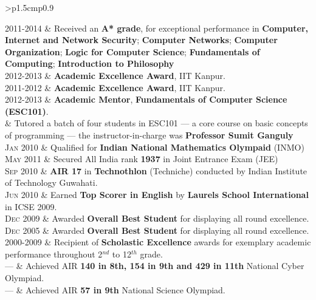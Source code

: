 \documentclass[a4paper,10pt]{article} %
\newcommand{\itemlist}[1]{
    \begin{tabular}{>{\raggedleft}p{1.5cm}p{0.9\linewidth}}
        #1
    \end{tabular}
}
\begin{document}
\itemlist {
    \textsc{2011-2014}   & Received an \textbf{A* grade}, for exceptional performance in
                            \textbf{Computer, Internet and Network Security};
                            \textbf{Computer Networks};
                            \textbf{Computer Organization};
                            \textbf{Logic for Computer Science};
                            \textbf{Fundamentals of Computing};
                            \textbf{Introduction to Philosophy} \\
    \textsc{2012-2013}   & \textbf{Academic Excellence Award}, IIT Kanpur. \\
    \textsc{2011-2012}   & \textbf{Academic Excellence Award}, IIT Kanpur. \\
    \textsc{2012-2013}   & \textbf{Academic Mentor}, \textbf{Fundamentals of Computer Science (ESC101)}. \\
                         & \footnotesize{Tutored a batch of four students in ESC101 --- a core course on
                            basic concepts of programming --- the instructor-in-charge was \textbf{Professor Sumit Ganguly}}\\
    \textsc{Jan 2010}    & Qualified for \textbf{Indian National Mathematics Olympaid} (INMO) \\
    \textsc{May 2011}    & Secured All India rank \textbf{1937} in Joint Entrance Exam (JEE) \\
    \textsc{Sep 2010}    & \textbf{AIR 17} in \textbf{Technothlon} (Techniche) conducted by Indian Institute of Technology Guwahati. \\
    \textsc{Jun 2010}    & Earned \textbf{Top Scorer in English} by \textbf{Laurels School International} in ICSE 2009. \\
    \textsc{Dec 2009}    & Awarded \textbf{Overall Best Student} for displaying all round excellence. \\
    \textsc{Dec 2005}    & Awarded \textbf{Overall Best Student} for displaying all round excellence. \\
    \textsc{2000-2009}   & Recipient of \textbf{Scholastic Excellence} awards for exemplary academic performance throughout
                            2$^{nd}$ to 12$^{th}$ grade. \\
    \textsc{---}         & Achieved AIR \textbf{140 in 8th, 154 in 9th and 429 in 11th} National Cyber Olympiad.\\
    \textsc{---}         & Achieved AIR \textbf{57 in 9th} National Science Olympiad.\\
}
\end{document}
